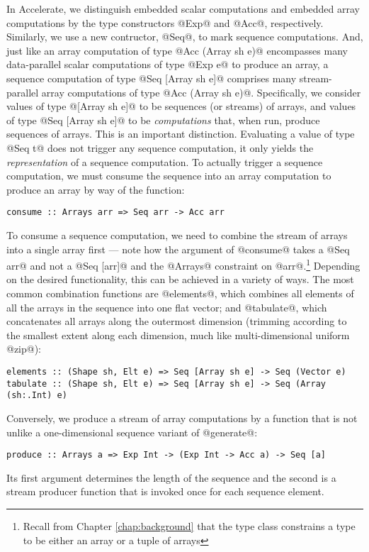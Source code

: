 In Accelerate, we distinguish embedded scalar computations and embedded array computations by the type constructors @Exp@ and @Acc@, respectively. Similarly, we use a new contructor, @Seq@, to mark sequence computations. And, just like an array computation of type @Acc (Array sh e)@ encompasses many data-parallel scalar computations of type @Exp e@ to produce an array, a sequence computation of type @Seq [Array sh e]@ comprises many stream-parallel array computations of type @Acc (Array sh e)@. Specifically, we consider values of type @[Array sh e]@ to be sequences (or streams) of arrays, and values of type @Seq [Array sh e]@ to be \emph{computations} that, when run, produce sequences of arrays. This is an important distinction. Evaluating a value of type @Seq t@ does not trigger any sequence computation, it only yields the \emph{representation} of a sequence computation. To actually trigger a sequence computation, we must consume the sequence into an array computation to produce an array by way of the function:
%
\begin{lstlisting}
consume :: Arrays arr => Seq arr -> Acc arr
\end{lstlisting}

To consume a sequence computation, we need to combine the stream of arrays into a single array first --- note how the argument of @consume@ takes a @Seq arr@ and not a @Seq [arr]@ and the @Arrays@ constraint on @arr@.\footnote{Recall from Chapter \ref{chap:background} that the type class  constrains a type to be either an array or a tuple of arrays} Depending on the desired functionality, this can be achieved in a variety of ways. The most common combination functions are @elements@, which combines all elements of all the arrays in the sequence into one flat vector; and @tabulate@, which concatenates all arrays along the outermost dimension (trimming according to the smallest extent along each dimension, much like multi-dimensional uniform @zip@):
%
\begin{lstlisting}
elements :: (Shape sh, Elt e) => Seq [Array sh e] -> Seq (Vector e)
tabulate :: (Shape sh, Elt e) => Seq [Array sh e] -> Seq (Array (sh:.Int) e)
\end{lstlisting}

Conversely, we produce a stream of array computations by a function that is not unlike a one-dimensional sequence variant of @generate@:
%
\begin{lstlisting}
produce :: Arrays a => Exp Int -> (Exp Int -> Acc a) -> Seq [a]
\end{lstlisting}
%
Its first argument determines the length of the sequence and the second is a stream producer function that is invoked once for each sequence element.


